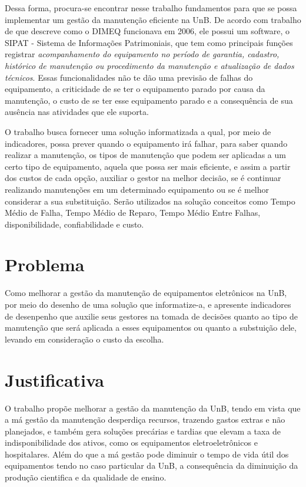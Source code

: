 Dessa forma, procura-se encontrar nesse trabalho fundamentos para que se possa implementar um gestão da manutenção eficiente na UnB. De acordo com trabalho de \cite{limacastilho2006} que descreve como o DIMEQ funcionava em 2006, ele possui um software, o SIPAT - Sistema de Informações Patrimoniais, que tem como principais funções registrar \emph{acompanhamento do equipamento no período de garantia, cadastro, histórico de manutenção ou procedimento da manutenção e atualização de dados técnicos}. Essas funcionalidades não te dão uma previsão de falhas do equipamento, a criticidade de se ter o equipamento parado por causa da manutenção, o custo de se ter esse equipamento parado e a consequência de sua ausência nas atividades que ele suporta.

O trabalho busca fornecer uma solução informatizada a qual, por meio de indicadores, possa prever quando o equipamento irá falhar, para saber quando realizar a manutenção, os tipos de manutenção que podem ser aplicadas a um certo tipo de equipamento, aquela que possa ser mais eficiente, e assim a partir dos custos de cada opção, auxiliar o gestor na melhor decisão, se é continuar realizando manutenções em um determinado equipamento ou se é melhor considerar a sua substituição. Serão utilizados na solução conceitos como Tempo Médio de Falha, Tempo Médio de Reparo, Tempo Médio Entre Falhas, disponibilidade, confiabilidade e custo. 



\section{Problema}

Como melhorar a gestão da manutenção de equipamentos eletrônicos na UnB, por meio do desenho de uma solução que informatize-a, e apresente indicadores de desenpenho que auxilie seus gestores na tomada de decisões quanto ao tipo de manutenção que será aplicada a esses equipamentos ou quanto a substuição dele, levando em consideração o custo da escolha. 


\section{Justificativa}

O trabalho propõe melhorar a gestão da manutenção da UnB, tendo em vista que a má gestão da manutenção desperdiça recursos, trazendo gastos extras e não planejados, e também gera soluções precárias e tardias que elevam a taxa de indisponibilidade dos ativos, como os equipamentos eletroeletrônicos e hospitalares. Além do que a má gestão pode diminuir o tempo de vida útil dos equipamentos tendo no caso particular da UnB, a consequência da diminuição da produção cientifica e da qualidade de ensino.

